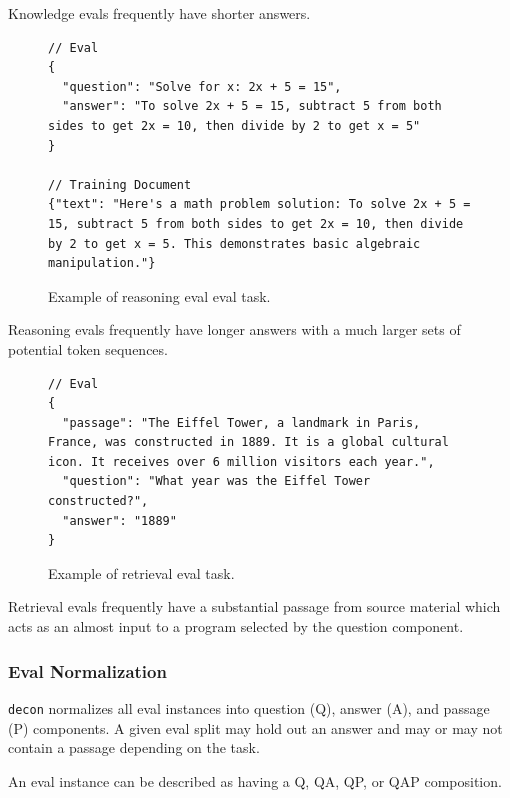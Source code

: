 \documentclass[table]{ai2style/ai2}
\begin{document}
{{Knowledge evals frequently have shorter answers.

\begin{figure}[ht]
\begin{lstlisting}
// Eval
{
  "question": "Solve for x: 2x + 5 = 15",
  "answer": "To solve 2x + 5 = 15, subtract 5 from both sides to get 2x = 10, then divide by 2 to get x = 5"
}

// Training Document
{"text": "Here's a math problem solution: To solve 2x + 5 = 15, subtract 5 from both sides to get 2x = 10, then divide by 2 to get x = 5. This demonstrates basic algebraic manipulation."}
\end{lstlisting}
\caption{Example of reasoning eval eval task.}
\label{fig:json-config}
\end{figure}

Reasoning evals frequently have longer answers with a much larger sets of potential token sequences.

\begin{figure}[ht]
\begin{lstlisting}
// Eval
{
  "passage": "The Eiffel Tower, a landmark in Paris, France, was constructed in 1889. It is a global cultural icon. It receives over 6 million visitors each year.",
  "question": "What year was the Eiffel Tower constructed?",
  "answer": "1889"
}
\end{lstlisting}
\caption{Example of retrieval eval task.}
\label{fig:json-config}
\end{figure}

Retrieval evals frequently have a substantial passage from source material which acts as an almost input to a program selected by the question component.

\subsubsection{Eval Normalization}

\texttt{decon} normalizes all eval instances into question (Q), answer (A), and passage (P) components. A given eval split may hold out an answer and may or may not contain a passage depending on the task.

An eval instance can be described as having a Q, QA, QP, or QAP composition.

}}
\end{document}
